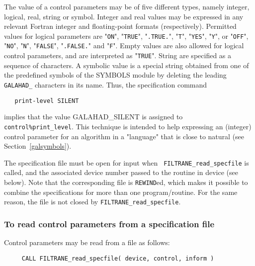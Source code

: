 \documentclass{galahad}
\newcommand{\packagename}{FILTRANE}
\newcommand{\sym}{\sf\small}
\begin{document}
The value of a control parameters may be of five different types, namely
integer, logical, real, string or symbol.
Integer and real values may be expressed in any relevant Fortran integer and
floating-point formats (respectively). Permitted values for logical
parameters are "{\tt ON}", "{\tt TRUE}", "{\tt .TRUE.}", "{\tt T}", 
"{\tt YES}", "{\tt Y}", or "{\tt OFF}", "{\tt NO}",
"{\tt N}", "{\tt FALSE}", "{\tt .FALSE.}" and "{\tt F}". 
Empty values are also allowed for logical control parameters, and are
interpreted as "{\tt TRUE}". String are specified as a sequence of characters.  
A symbolic value is a special string obtained from one of the predefined
symbols of the SYMBOLS module by deleting the leading {\tt GALAHAD\_}
characters in its name. Thus, the specification command
\begin{verbatim}
   print-level SILENT
\end{verbatim}
implies that the value {\sym GALAHAD\_SILENT} is assigned to {\tt
control\%print\_level}.  This technique is intended to help expressing an
(integer) control parameter for an algorithm  in a "language" that is close to
natural (see Section~\ref{galsymbols}). 

The specification file must be open for input when {\tt
\packagename\_read\_specfile} is called, and the associated device number
passed to the routine in device (see below).  Note that the corresponding  
file is {\tt REWIND}ed, which makes it possible to combine the specifications 
for more than one program/routine.  For the same reason, the file is not
closed by {\tt \packagename\_read\_specfile}.

\subsubsection{To read control parameters from a specification file}
\label{readspec}

Control parameters may be read from a file as follows:
\hskip0.5in 
\def\baselinestretch{0.8} {\tt \begin{verbatim}
     CALL FILTRANE_read_specfile( device, control, inform )
\end{verbatim}}
\def\baselinestretch{1.0}
\end{document}
